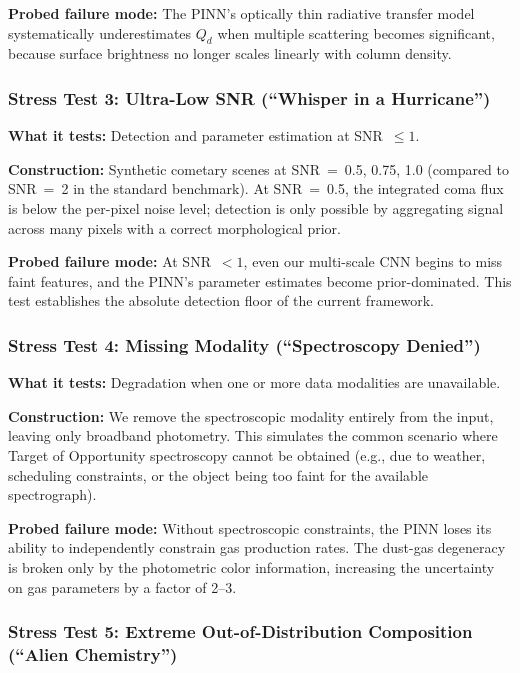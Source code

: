 \documentclass[preprint2]{aastex631}
\begin{document}
\textbf{Probed failure mode:} The PINN's optically thin radiative transfer model systematically underestimates $Q_d$ when multiple scattering becomes significant, because surface brightness no longer scales linearly with column density.

\subsubsection{Stress Test 3: Ultra-Low SNR (``Whisper in a Hurricane'')}

\textbf{What it tests:} Detection and parameter estimation at SNR~$\leq 1$.

\textbf{Construction:} Synthetic cometary scenes at SNR~=~0.5, 0.75, 1.0 (compared to SNR~=~2 in the standard benchmark). At SNR~=~0.5, the integrated coma flux is below the per-pixel noise level; detection is only possible by aggregating signal across many pixels with a correct morphological prior.

\textbf{Probed failure mode:} At SNR~$<1$, even our multi-scale CNN begins to miss faint features, and the PINN's parameter estimates become prior-dominated. This test establishes the absolute detection floor of the current framework.

\subsubsection{Stress Test 4: Missing Modality (``Spectroscopy Denied'')}

\textbf{What it tests:} Degradation when one or more data modalities are unavailable.

\textbf{Construction:} We remove the spectroscopic modality entirely from the input, leaving only broadband photometry. This simulates the common scenario where Target of Opportunity spectroscopy cannot be obtained (e.g., due to weather, scheduling constraints, or the object being too faint for the available spectrograph).

\textbf{Probed failure mode:} Without spectroscopic constraints, the PINN loses its ability to independently constrain gas production rates. The dust-gas degeneracy is broken only by the photometric color information, increasing the uncertainty on gas parameters by a factor of 2--3.

\subsubsection{Stress Test 5: Extreme Out-of-Distribution Composition (``Alien Chemistry'')}
\end{document}
